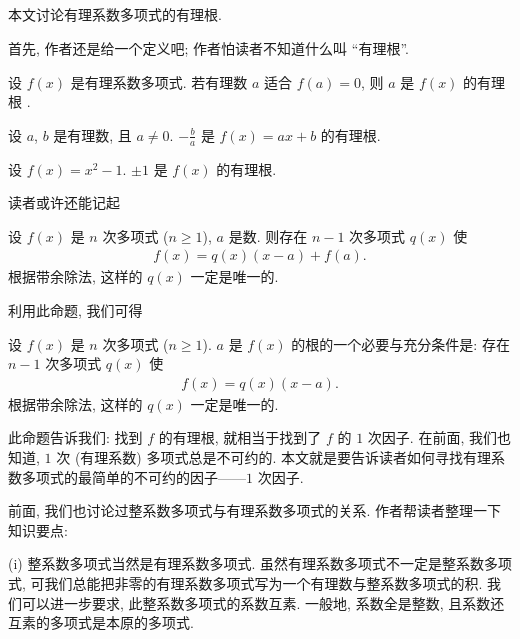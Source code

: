 \subsection*{\RationalRootsOfPolynomialsOverQ}
\markright{\RationalRootsOfPolynomialsOverQ}

本文讨论有理系数多项式的有理根.

首先, 作者还是给一个定义吧; 作者怕读者不知道什么叫 ``有理根''.

\begin{definition}
    设 $f(x)$ 是有理系数多项式. 若有理数 $a$ 适合 $f(a) = 0$, 则 $a$ 是 $f(x)$ 的有理根 .
\end{definition}

\begin{example}
    设 $a$, $b$ 是有理数, 且 $a \neq 0$. $-\frac{b}{a}$ 是 $f(x) = ax + b$ 的有理根.
\end{example}

\begin{example}
    设 $f(x) = x^2 - 1$. $\pm 1$ 是 $f(x)$ 的有理根.
\end{example}

读者或许还能记起
\begin{proposition}
    设 $f(x)$ 是 $n$ 次多项式 ($n \geq 1$), $a$ 是数. 则存在 $n-1$ 次多项式 $q(x)$ 使
    \begin{align*}
        f(x) = q(x) (x-a) + f(a).
    \end{align*}
    根据带余除法, 这样的 $q(x)$ 一定是唯一的.
\end{proposition}

利用此命题, 我们可得
\begin{proposition}
    设 $f(x)$ 是 $n$ 次多项式 ($n \geq 1$). $a$ 是 $f(x)$ 的根的一个必要与充分条件是: 存在 $n-1$ 次多项式 $q(x)$ 使
    \begin{align*}
        f(x) = q(x) (x-a).
    \end{align*}
    根据带余除法, 这样的 $q(x)$ 一定是唯一的.
\end{proposition}

此命题告诉我们: 找到 $f$ 的有理根, 就相当于找到了 $f$ 的 $1$ 次因子. 在前面, 我们也知道, $1$ 次 (有理系数) 多项式总是不可约的. 本文就是要告诉读者如何寻找有理系数多项式的最简单的不可约的因子——$1$ 次因子.

前面, 我们也讨论过整系数多项式与有理系数多项式的关系. 作者帮读者整理一下知识要点:

(i) 整系数多项式当然是有理系数多项式. 虽然有理系数多项式不一定是整系数多项式, 可我们总能把非零的有理系数多项式写为一个有理数与整系数多项式的积. 我们可以进一步要求, 此整系数多项式的系数互素. 一般地, 系数全是整数, 且系数还互素的多项式是本原的多项式.

